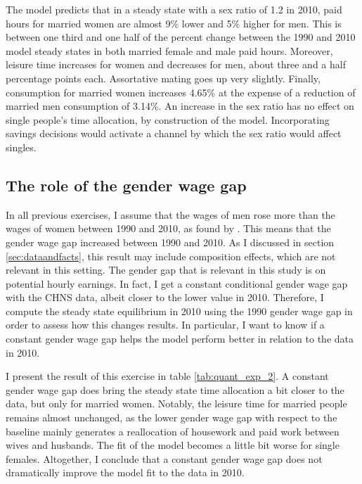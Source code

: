 \documentclass[12pt]{article}
\begin{document}
The model predicts that in a steady state with a sex ratio of 1.2 in 2010, paid hours for married women are almost 9\% lower and 5\% higher for men. This is between one third and one half of the percent change between the 1990 and 2010 model steady states in both married female and male paid hours. Moreover, leisure time increases for women and decreases for men, about three and a half percentage points each. Assortative mating goes up very slightly. Finally, consumption for married women increases 4.65\% at the expense of a reduction of married men consumption of 3.14\%. An increase in the sex ratio has no effect on single people's time allocation, by construction of the model. Incorporating savings decisions would activate a channel by which the sex ratio would affect singles.

\subsection{The role of the gender wage gap}

In all previous exercises, I assume that the wages of men rose more than the wages of women between 1990 and 2010, as found by \cite{getao14}. This means that the gender wage gap increased between 1990 and 2010. As I discussed in section \ref{sec:dataandfacts}, this result may include composition effects, which are not relevant in this setting. The gender gap that is relevant in this study is on potential hourly earnings. In fact, I get a constant conditional gender wage gap with the CHNS data, albeit closer to the lower value in 2010. Therefore, I compute the steady state equilibrium in 2010 using the 1990 gender wage gap in order to assess how this changes results. In particular, I want to know if a constant gender wage gap helps the model perform better in relation to the data in 2010.

I present the result of this exercise in table \ref{tab:quant_exp_2}. A constant gender wage gap does bring the steady state time allocation a bit closer to the data, but only for married women. Notably, the leisure time for married people remains almost unchanged, as the lower gender wage gap with respect to the baseline mainly generates a reallocation of housework and paid work between wives and husbands. The fit of the model becomes a little bit worse for single females. Altogether, I conclude that a constant gender wage gap does not dramatically improve the model fit to the data in 2010. 
\end{document}
